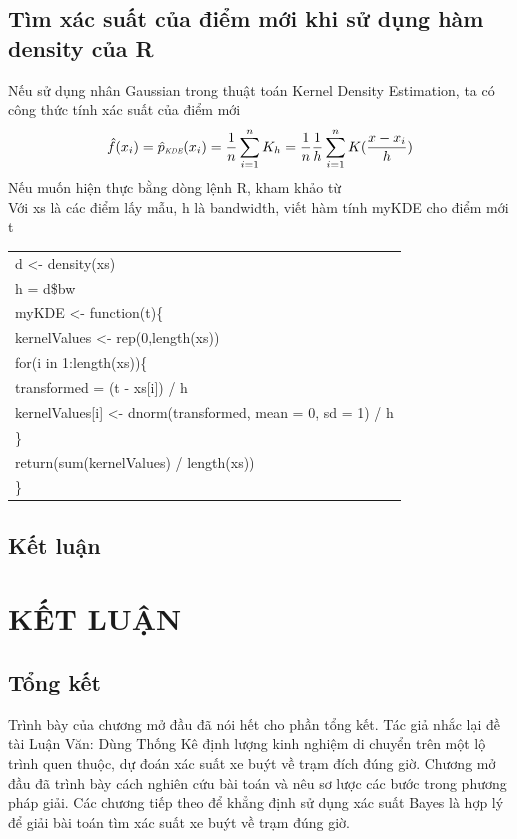 \documentclass[a4paper, 13pt]{report}
\begin{document}
\section{Tìm xác suất của điểm mới khi sử dụng hàm density của R}
Nếu sử dụng nhân Gaussian trong thuật toán Kernel Density Estimation, ta có công thức tính xác suất của điểm mới 
\[
\hat{f}(x_i) = \hat{p}_\textit{\tiny\tiny KDE}(x_i) = \frac{1}{n}\sum_{i=1}^{n} K_h = \frac{1}{n}\frac{1}{h}\sum_{i=1}^{n} K(\frac{x-x_i}{h})
\]
Nếu muốn hiện thực bằng dòng lệnh R, kham khảo từ \cite{FPDNPU} \\
Với xs là các điểm lấy mẫu, h là bandwidth, viết hàm tính myKDE cho điểm mới t\\
\begin{tabular}{ |l| } 
 \hline
d <- density(xs)\\
h = d\$bw\\
myKDE <- function(t)\{\\
\hspace{1cm}kernelValues <- rep(0,length(xs))\\
\hspace{1cm}for(i in 1:length(xs))\{\\
\hspace{2cm}transformed = (t - xs[i]) / h\\
\hspace{2cm}kernelValues[i] <- dnorm(transformed, mean = 0, sd = 1) / h\\
\hspace{1cm}\}\\
\hspace{1cm}return(sum(kernelValues) / length(xs))\\
\}\\
\hline
\end{tabular}
\section{Kết luận}
\chapter{KẾT LUẬN}
\section{Tổng kết}
Trình bày của chương mở đầu đã nói hết cho phần tổng kết. Tác giả nhắc lại đề tài Luận Văn: Dùng Thống Kê định lượng kinh nghiệm di chuyển trên một lộ trình quen thuộc, dự đoán xác suất xe buýt về trạm đích đúng giờ. Chương mở đầu đã trình bày cách nghiên cứu bài toán và nêu sơ lược các bước trong phương pháp giải. Các chương tiếp theo để khẳng định sử dụng xác suất Bayes là hợp lý để giải bài toán tìm xác suất xe buýt về trạm đúng giờ. 
\end{document}
